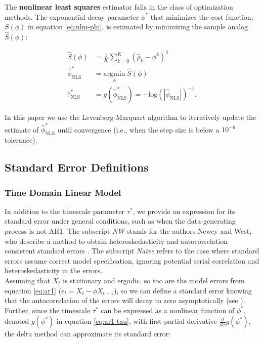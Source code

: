 \documentclass[main.tex]{subfiles}
\begin{document}
The \textbf{nonlinear least squares} estimator falls in the class of optimization methods. The exponential decay parameter $\phi^*$ that minimizes the cost function, $S(\phi)$ in equation \eqref{eq:nlm-phi}, is estimated by minimizing the sample analog $\widehat{S}(\phi)$:

\begin{align}
    \widehat{S}(\phi) &= \frac{1}{K} \sum_{k=0}^K (\hat\rho_k - \phi^k)^2\\
    \hat \phi^*_{\scriptscriptstyle\text{NLS}} &= \underset{\phi}{\text{argmin}} \; \widehat{S}(\phi)\\
    \hat \tau^*_{\scriptscriptstyle\text{NLS}} &= g(\hat \phi^*_{\scriptscriptstyle\text{NLS}}) = -{\text{log}(|\hat\phi_{\scriptscriptstyle\text{NLS}}|)}^{-1}.
\end{align}

\noindent In this paper we use the Levenberg-Marquart algorithm to iteratively update the estimate of $\hat \phi^*_{\scriptscriptstyle\text{NLS}}$ until convergence (i.e., when the step size is below a $10^{-6}$ tolerance).\\

\subsection{Standard Error Definitions}
\subsubsection{Time Domain Linear Model}

In addition to the timescale parameter $\tau^*$, we provide an expression for its standard error under general conditions, such as when the data-generating process is not AR1. The subscript \textit{NW} stands for the authors Newey and West, who describe a method to obtain heteroskedasticity and autocorrelation consistent standard errors \citep{newey_simple_1987}. The subscript \textit{Naive} refers to the case where standard errors assume correct model specification, ignoring potential serial correlation and heteroskedasticity in the errors.\\

Assuming that $X_t$ is stationary and ergodic, so too are the model errors from equation \eqref{eq:ar1} ($e_t = X_t - \phi X_{t-1}$), so we can define a standard error knowing that the autocorrelation of the errors will decay to zero asymptotically (see ). Further, since the timescale $\tau^*$ can be expressed as a nonlinear function of $\phi^*$, denoted $g(\phi^*)$ in equation \eqref{eq:ar1-tau}, with first partial derivative $\frac{d}{d\phi} g(\phi^*)$, the delta method can approximate its standard error:
\end{document}
